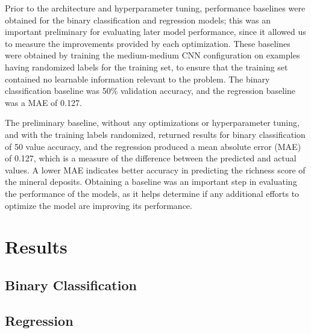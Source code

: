 \documentclass[10pt]{article}
\begin{document}


Prior to the architecture and hyperparameter tuning, performance baselines were
obtained for the binary classification and regression models; this was an
important preliminary for evaluating later model performance, since it allowed us to
measure the improvements provided by each optimization.
These baselines were obtained by training the medium-medium CNN configuration
on examples having randomized labels for the training set, to ensure that
the training set contained no learnable information relevant to the problem.
The binary classification baseline was 50\% validation accuracy, and the
regression baseline was a MAE of 0.127.

The preliminary baseline, without any optimizations or hyperparameter tuning,
and with the training labels randomized, returned results for binary classification of 50
value accuracy, and the regression produced a mean absolute error (MAE) of 0.127,
which is a measure of the difference between the predicted and actual values.
A lower MAE indicates better accuracy in predicting the richness score of the mineral deposits.
Obtaining a baseline was an important step in evaluating the performance of the models,
as it helps determine if any additional efforts to optimize the model are improving its performance.

\section{Results}


\subsection{Binary Classification}


\subsection{Regression}

\end{document}

